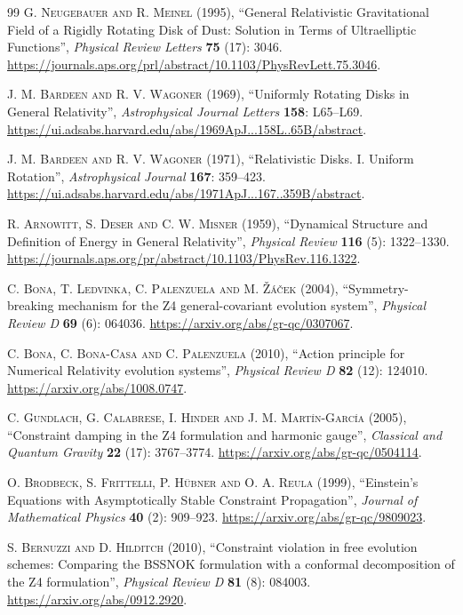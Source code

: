 \documentclass{article}
\begin{document}
\begin{thebibliography}{99}
\textsc{G. Neugebauer and R. Meinel} (1995), ``General Relativistic Gravitational Field of a Rigidly Rotating Disk of Dust: Solution in Terms of Ultraelliptic Functions'', \textit{Physical Review Letters} \textbf{75} (17): 3046. \url{https://journals.aps.org/prl/abstract/10.1103/PhysRevLett.75.3046}.

\textsc{J. M. Bardeen and R. V. Wagoner} (1969), ``Uniformly Rotating Disks in General Relativity'', \textit{Astrophysical Journal Letters} \textbf{158}: L65--L69. \url{https://ui.adsabs.harvard.edu/abs/1969ApJ...158L..65B/abstract}.

\textsc{J. M. Bardeen and R. V. Wagoner} (1971), ``Relativistic Disks. I. Uniform Rotation'', \textit{Astrophysical Journal} \textbf{167}: 359--423. \url{https://ui.adsabs.harvard.edu/abs/1971ApJ...167..359B/abstract}.

\textsc{R. Arnowitt, S. Deser and C. W. Misner} (1959), ``Dynamical Structure and Definition of Energy in General Relativity'', \textit{Physical Review} \textbf{116} (5): 1322--1330. \url{https://journals.aps.org/pr/abstract/10.1103/PhysRev.116.1322}.

\textsc{C. Bona, T. Ledvinka, C. Palenzuela and M. \v{Z}\'a\v{c}ek} (2004), ``Symmetry-breaking mechanism for the Z4 general-covariant evolution system'', \textit{Physical Review D} \textbf{69} (6): 064036. \url{https://arxiv.org/abs/gr-qc/0307067}.

\textsc{C. Bona, C. Bona-Casa and C. Palenzuela} (2010), ``Action principle for Numerical Relativity evolution systems'', \textit{Physical Review D} \textbf{82} (12): 124010. \url{https://arxiv.org/abs/1008.0747}.

\textsc{C. Gundlach, G. Calabrese, I. Hinder and J. M. Mart\'in-Garc\'ia} (2005), ``Constraint damping in the Z4 formulation and harmonic gauge'', \textit{Classical and Quantum Gravity} \textbf{22} (17): 3767--3774. \url{https://arxiv.org/abs/gr-qc/0504114}.

\textsc{O. Brodbeck, S. Frittelli, P. H\"ubner and O. A. Reula} (1999), ``Einstein's Equations with Asymptotically Stable Constraint Propagation'', \textit{Journal of Mathematical Physics} \textbf{40} (2): 909--923. \url{https://arxiv.org/abs/gr-qc/9809023}.

\textsc{S. Bernuzzi and D. Hilditch} (2010), ``Constraint violation in free evolution schemes: Comparing the BSSNOK formulation with a conformal decomposition of the Z4 formulation'', \textit{Physical Review D} \textbf{81} (8): 084003. \url{https://arxiv.org/abs/0912.2920}.


\end{thebibliography}
\end{document}
